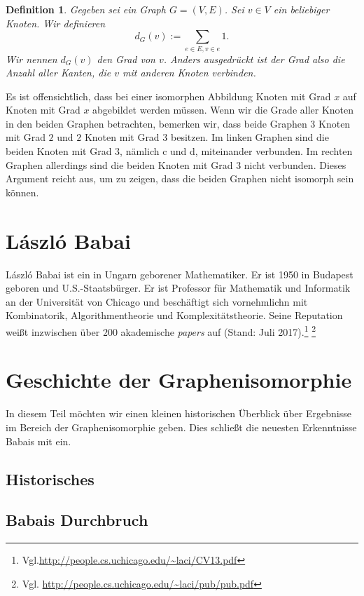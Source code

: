 \documentclass[a4paper]{article}
\newtheorem{definition}{Definition}
\newcommand{\babai}{\url{http://people.cs.uchicago.edu/~laci/CV13.pdf}}
\newcommand{\babaipublications}{\url{http://people.cs.uchicago.edu/~laci/pub/pub.pdf}}
\begin{document}
\begin{definition}
Gegeben sei ein Graph $G = (V,E)$. Sei $v\in V$ ein beliebiger Knoten. Wir definieren $$d_G(v) := \sum_{e\in E, v\in e} 1.$$
Wir nennen $d_G(v)$ den Grad von $v$. Anders ausgedrückt ist der Grad also die Anzahl aller Kanten, die $v$ mit anderen Knoten verbinden.
\end{definition}

Es ist offensichtlich, dass bei einer isomorphen Abbildung Knoten mit Grad $x$ auf Knoten mit Grad $x$ abgebildet werden müssen.
Wenn wir die Grade aller Knoten in den beiden Graphen betrachten, bemerken wir, dass beide Graphen $3$ Knoten mit Grad $2$ und $2$ Knoten mit Grad $3$ besitzen. Im linken Graphen sind die beiden Knoten mit Grad $3$, nämlich c und d, miteinander verbunden. Im rechten Graphen allerdings sind die beiden Knoten mit Grad $3$ nicht verbunden. Dieses Argument reicht aus, um zu zeigen, dass die beiden Graphen nicht isomorph sein können. 



\section{L\'{a}szl\'{o} Babai}
L\'{a}szl\'{o} Babai ist ein in Ungarn geborener Mathematiker. Er ist 1950 in Budapest geboren und U.S.-Staatsbürger. Er ist Professor für Mathematik und Informatik an der Universität von Chicago und beschäftigt sich vornehmlichn mit Kombinatorik, Algorithmentheorie und Komplexitätstheorie. Seine Reputation weißt inzwischen über 200 akademische \emph{papers} auf (Stand: Juli 2017).\footnote{Vgl.\hspace{0.1cm}\babai} \footnote{Vgl. \babaipublications}

\section{Geschichte der Graphenisomorphie} \label{sec:historical}

In diesem Teil möchten wir einen kleinen historischen Überblick über Ergebnisse im Bereich der Graphenisomorphie geben. Dies schließt die neuesten Erkenntnisse Babais mit ein.
\subsection{Historisches}

\subsection{Babais Durchbruch}
\end{document}
